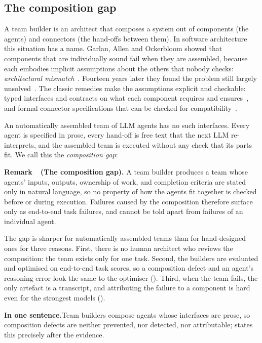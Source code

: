 \documentclass[10pt,a4paper]{article}
\newcounter{remark}
\newenvironment{remark}[1][]{%
  \refstepcounter{remark}%
  \begin{tcolorbox}[enhanced, colback=accentlight, colframe=accentlight,
      borderline west={2.2pt}{0pt}{accent}, arc=0pt, boxrule=0pt,
      left=8pt, right=8pt, top=5pt, bottom=5pt, before skip=8pt, after skip=8pt]
  \textsf{\bfseries\color{accent}Remark~\theremark\if\relax\detokenize{#1}\relax\else\ (#1)\fi.}\enspace}%
  {\end{tcolorbox}}
\begin{document}
\subsection{The composition gap}

A team builder is an architect that composes a system out of components (the
agents) and connectors (the hand-offs between them). In software
architecture this situation has a name. Garlan, Allen and Ockerbloom showed
that components that are individually sound fail when they are assembled,
because each embodies implicit assumptions about the others that nobody
checks: \emph{architectural mismatch}~\cite{garlan1995mismatch}. Fourteen
years later they found the problem still largely
unsolved~\cite{garlan2009mismatch}. The classic remedies make the
assumptions explicit and checkable: typed interfaces and contracts on what
each component requires and ensures~\cite{meyer1992dbc}, and formal
connector specifications that can be checked for
compatibility~\cite{allen1997connection}.

An automatically assembled team of LLM agents has no such interfaces. Every
agent is specified in prose, every hand-off is free text that the next LLM
re-interprets, and the assembled team is executed without any check that its
parts fit. We call this the \emph{composition gap}:

\begin{remark}[The composition gap]
A team builder produces a team whose agents' inputs, outputs, ownership of
work, and completion criteria are stated only in natural language, so no
property of how the agents fit together is checked before or during
execution. Failures caused by the composition therefore surface only as
end-to-end task failures, and cannot be told apart from failures of an
individual agent.
\end{remark}

The gap is sharper for automatically assembled teams than for hand-designed
ones for three reasons. First, there is no human architect who reviews the
composition: the team exists only for one task. Second, the builders are
evaluated and optimised on end-to-end task scores, so a composition defect
and an agent's reasoning error look the same to the optimiser
(). Third, when the team fails, the only artefact is a
transcript, and attributing the failure to a component is hard even for
the strongest models ().

\begin{tcolorbox}[enhanced, colback=accentlight, colframe=accentlight, arc=0pt,
   boxrule=0pt, borderline west={2.2pt}{0pt}{accent}, left=10pt, right=10pt,
   top=6pt, bottom=6pt]
{\sffamily\bfseries\color{accent}In one sentence.}\enspace Team builders
compose agents whose interfaces are prose, so composition defects are
neither prevented, nor detected, nor attributable; 
states this precisely after the evidence.
\end{tcolorbox}
\end{document}
